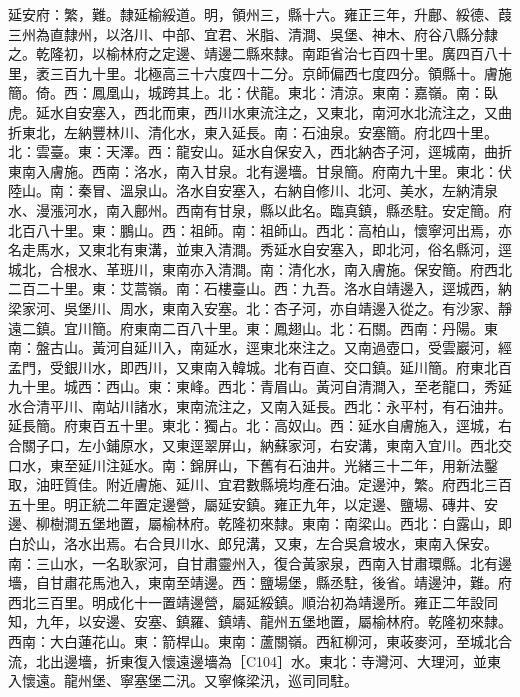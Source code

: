 \begin{pinyinscope}
延安府：繁，難。隸延榆綏道。明，領州三，縣十六。雍正三年，升鄜、綏德、葭三州為直隸州，以洛川、中部、宜君、米脂、清澗、吳堡、神木、府谷八縣分隸之。乾隆初，以榆林府之定邊、靖邊二縣來隸。南距省治七百四十里。廣四百八十里，袤三百九十里。北極高三十六度四十二分。京師偏西七度四分。領縣十。膚施簡。倚。西：鳳凰山，城跨其上。北：伏龍。東北：清涼。東南：嘉嶺。南：臥虎。延水自安塞入，西北而東，西川水東流注之，又東北，南河水北流注之，又曲折東北，左納豐林川、清化水，東入延長。南：石油泉。安塞簡。府北四十里。北：雲臺。東：天澤。西：龍安山。延水自保安入，西北納杏子河，逕城南，曲折東南入膚施。西南：洛水，南入甘泉。北有邊墻。甘泉簡。府南九十里。東北：伏陸山。南：秦冒、溫泉山。洛水自安塞入，右納自修川、北河、美水，左納清泉水、漫漲河水，南入鄜州。西南有甘泉，縣以此名。臨真鎮，縣丞駐。安定簡。府北百八十里。東：鵬山。西：祖師。南：祖師山。西北：高柏山，懷寧河出焉，亦名走馬水，又東北有東溝，並東入清澗。秀延水自安塞入，即北河，俗名縣河，逕城北，合根水、革班川，東南亦入清澗。南：清化水，南入膚施。保安簡。府西北二百二十里。東：艾蒿嶺。南：石樓臺山。西：九吾。洛水自靖邊入，逕城西，納梁家河、吳堡川、周水，東南入安塞。北：杏子河，亦自靖邊入從之。有沙家、靜遠二鎮。宜川簡。府東南二百八十里。東：鳳翅山。北：石關。西南：丹陽。東南：盤古山。黃河自延川入，南延水，逕東北來注之。又南過壺口，受雲巖河，經孟門，受銀川水，即西川，又東南入韓城。北有百直、交口鎮。延川簡。府東北百九十里。城西：西山。東：東峰。西北：青眉山。黃河自清澗入，至老龍口，秀延水合清平川、南站川諸水，東南流注之，又南入延長。西北：永平村，有石油井。延長簡。府東百五十里。東北：獨占。北：高奴山。西：延水自膚施入，逕城，右合關子口，左小鋪原水，又東逕翠屏山，納蘇家河，右安溝，東南入宜川。西北交口水，東至延川注延水。南：錦屏山，下舊有石油井。光緒三十二年，用新法鑿取，油旺質佳。附近膚施、延川、宜君數縣境均產石油。定邊沖，繁。府西北三百五十里。明正統二年置定邊營，屬延安鎮。雍正九年，以定邊、鹽場、磚井、安邊、柳樹澗五堡地置，屬榆林府。乾隆初來隸。東南：南梁山。西北：白露山，即白於山，洛水出焉。右合貝川水、郎兒溝，又東，左合吳倉坡水，東南入保安。南：三山水，一名耿家河，自甘肅靈州入，復合黃家泉，西南入甘肅環縣。北有邊墻，自甘肅花馬池入，東南至靖邊。西：鹽場堡，縣丞駐，後省。靖邊沖，難。府西北三百里。明成化十一置靖邊營，屬延綏鎮。順治初為靖邊所。雍正二年設同知，九年，以安邊、安塞、鎮羅、鎮靖、龍州五堡地置，屬榆林府。乾隆初來隸。西南：大白蓮花山。東：箭桿山。東南：蘆關嶺。西紅柳河，東荍麥河，至城北合流，北出邊墻，折東復入懷遠邊墻為［C104］水。東北：寺灣河、大理河，並東入懷遠。龍州堡、寧塞堡二汛。又寧條梁汛，巡司同駐。


\end{pinyinscope}
